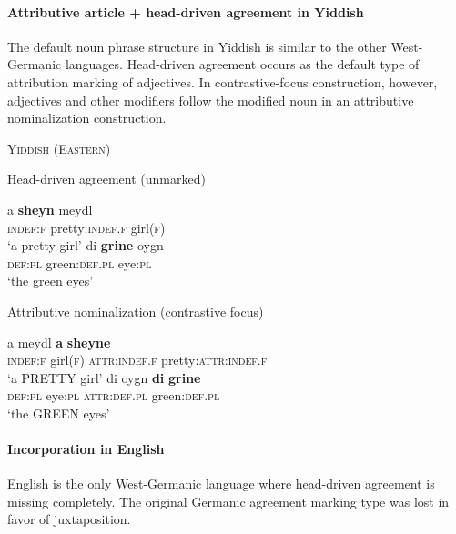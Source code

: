 \paragraph{Attributive article + head-driven agreement in Yiddish} \label{yiddish synchr}
The default noun phrase structure in Yiddish is similar to the other West-Germanic languages. Head-driven agreement occurs as the default type of attribution marking of adjectives. In con\-trastive-focus construction, however, adjectives and other modifiers follow the modified noun in an attributive nominalization construction.
\begin{exe}
\ex \textsc{Yiddish (Eastern)} \cite[96]{jacobs-etal1994}
\begin{xlist}
\ex Head-driven agreement (unmarked)
\begin{xlist}
\ex 
\gll	a \textbf{sheyn} meydl\\
	\textsc{indef:f} pretty:\textsc{indef.f} girl\textsc{(f)}\\
\glt	‘a pretty girl’
\ex
\gll	di \textbf{grine} oygn\\
	\textsc{def:pl} green:\textsc{def.pl} eye:\textsc{pl}\\
\glt	‘the green eyes’
\end{xlist}
\ex Attributive nominalization (contrastive focus)
\begin{xlist}
\ex
\gll	a meydl \textbf{a} \textbf{sheyne}\\
	\textsc{indef:f} girl\textsc{(f)} \textsc{attr:indef.f} pretty:\textsc{attr:indef.f}\\
\glt	‘a PRETTY girl’
\ex
\gll	di oygn \textbf{di} \textbf{grine}\\
	\textsc{def:pl} eye:\textsc{pl} \textsc{attr:def.pl} green:\textsc{def.pl} \\
\glt	‘the GREEN eyes’
\end{xlist}
\end{xlist}
\end{exe}

\paragraph{Incorporation in English}
English is the only West-Germanic language where head-driven agreement is missing completely. The original Germanic agreement marking type was lost in favor of juxtaposition. 

